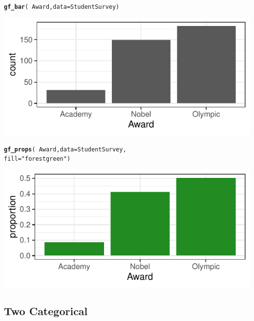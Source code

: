 \documentclass[10pt]{report}\usepackage[]{graphicx}\usepackage[]{xcolor}
\makeatletter
\newcommand{\hlsng}[1]{\textcolor[rgb]{0.192,0.494,0.8}{#1}}%
\newcommand{\hlopt}[1]{\textcolor[rgb]{0,0,0}{#1}}%
\newcommand{\hldef}[1]{\textcolor[rgb]{0.345,0.345,0.345}{#1}}%
\newcommand{\hlkwc}[1]{\textcolor[rgb]{0.333,0.667,0.333}{#1}}%
\newcommand{\hlkwd}[1]{\textcolor[rgb]{0.737,0.353,0.396}{\textbf{#1}}}%
\newenvironment{kframe}{%
 \def\at@end@of@kframe{}%
 \ifinner\ifhmode%
  \def\at@end@of@kframe{\end{minipage}}%
  \begin{minipage}{\columnwidth}%
 \fi\fi%
 \def\FrameCommand##1{\hskip\@totalleftmargin \hskip-\fboxsep
 \colorbox{shadecolor}{##1}\hskip-\fboxsep
     \hskip-\linewidth \hskip-\@totalleftmargin \hskip\columnwidth}%
 \MakeFramed {\advance\hsize-\width
   \@totalleftmargin\z@ \linewidth\hsize
   \@setminipage}}%
 {\par\unskip\endMakeFramed%
 \at@end@of@kframe}
\newenvironment{knitrout}{}{} %
\makeatother
\begin{document}
\begin{multicols}{3}
\begin{knitrout}\small
{}\color{fgcolor}\begin{kframe}
\begin{alltt}
\hlkwd{gf_bar}\hldef{(}\hlopt{~}\hldef{Award,}\hlkwc{data}\hldef{=StudentSurvey)}
\end{alltt}
\end{kframe}

{\centering \includegraphics[width=.25\textwidth,height=.125\textwidth]{figure/unnamed-chunk-15-1} 

}


\end{knitrout}
\columnbreak

\begin{knitrout}\small
{}\color{fgcolor}\begin{kframe}
\begin{alltt}
\hlkwd{gf_props}\hldef{(}\hlopt{~}\hldef{Award,}\hlkwc{data}\hldef{=StudentSurvey,}
         \hlkwc{fill} \hldef{=} \hlsng{"forestgreen"}\hldef{)}
\end{alltt}
\end{kframe}

{\centering \includegraphics[width=.25\textwidth,height=.125\textwidth]{figure/unnamed-chunk-16-1} 

}


\end{knitrout}

\vspace*{-.15in}
\subsection*{Two Categorical}



\end{multicols}
\end{document}
